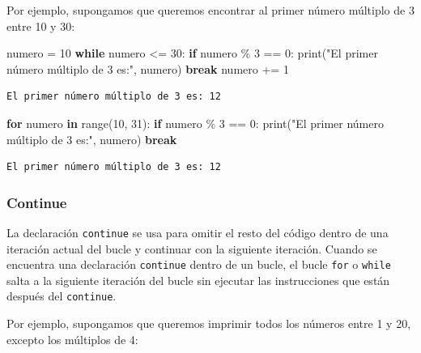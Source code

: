 \documentclass[
  letterpaper,
  DIV=11,
  numbers=noendperiod]{scrreprt}
\newenvironment{Shaded}{\begin{snugshade}}{\end{snugshade}}
\newcommand{\BuiltInTok}[1]{\textcolor[rgb]{0.00,0.23,0.31}{#1}}
\newcommand{\ControlFlowTok}[1]{\textcolor[rgb]{0.00,0.23,0.31}{\textbf{#1}}}
\newcommand{\DecValTok}[1]{\textcolor[rgb]{0.68,0.00,0.00}{#1}}
\newcommand{\KeywordTok}[1]{\textcolor[rgb]{0.00,0.23,0.31}{\textbf{#1}}}
\newcommand{\NormalTok}[1]{\textcolor[rgb]{0.00,0.23,0.31}{#1}}
\newcommand{\OperatorTok}[1]{\textcolor[rgb]{0.37,0.37,0.37}{#1}}
\newcommand{\StringTok}[1]{\textcolor[rgb]{0.13,0.47,0.30}{#1}}
\begin{document}
Por ejemplo, supongamos que queremos encontrar al primer número múltiplo
de 3 entre 10 y 30:

\begin{Shaded}
\begin{Highlighting}[]
\NormalTok{numero }\OperatorTok{=} \DecValTok{10}
\ControlFlowTok{while}\NormalTok{ numero }\OperatorTok{\textless{}=} \DecValTok{30}\NormalTok{:}
  \ControlFlowTok{if}\NormalTok{ numero }\OperatorTok{\%} \DecValTok{3} \OperatorTok{==} \DecValTok{0}\NormalTok{:}
      \BuiltInTok{print}\NormalTok{(}\StringTok{"El primer número múltiplo de 3 es:"}\NormalTok{, numero)}
      \ControlFlowTok{break}
\NormalTok{  numero }\OperatorTok{+=} \DecValTok{1}
\end{Highlighting}
\end{Shaded}

\begin{verbatim}
El primer número múltiplo de 3 es: 12
\end{verbatim}

\begin{Shaded}
\begin{Highlighting}[]
\ControlFlowTok{for}\NormalTok{ numero }\KeywordTok{in} \BuiltInTok{range}\NormalTok{(}\DecValTok{10}\NormalTok{, }\DecValTok{31}\NormalTok{):}
  \ControlFlowTok{if}\NormalTok{ numero }\OperatorTok{\%} \DecValTok{3} \OperatorTok{==} \DecValTok{0}\NormalTok{:}
      \BuiltInTok{print}\NormalTok{(}\StringTok{"El primer número múltiplo de 3 es:"}\NormalTok{, numero)}
      \ControlFlowTok{break}
\end{Highlighting}
\end{Shaded}

\begin{verbatim}
El primer número múltiplo de 3 es: 12
\end{verbatim}

\subsubsection{Continue}\label{continue}

La declaración \texttt{continue} se usa para omitir el resto del código
dentro de una iteración actual del bucle y continuar con la siguiente
iteración. Cuando se encuentra una declaración \texttt{continue} dentro
de un bucle, el bucle \texttt{for} o \texttt{while} salta a la siguiente
iteración del bucle sin ejecutar las instrucciones que están después del
\texttt{continue}.

Por ejemplo, supongamos que queremos imprimir todos los números entre 1
y 20, excepto los múltiplos de 4:
\end{document}

